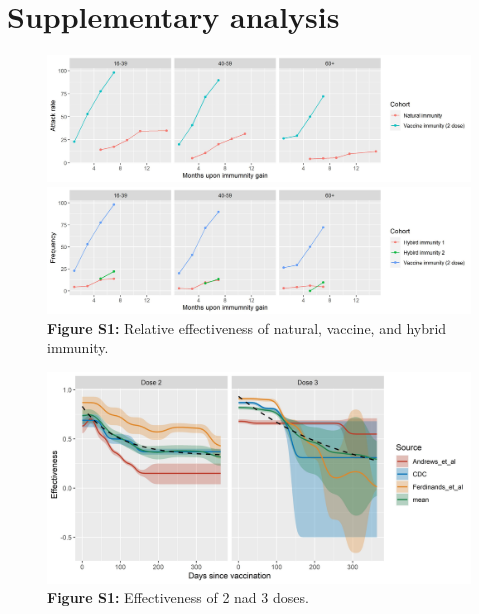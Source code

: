 \documentclass[12pt]{article}
\begin{document}
\section{Supplementary analysis}

\begin{figure}[h]
    \includegraphics*[width=\textwidth]{vaccine_unvaccinated.jpg}
    \includegraphics*[width=\textwidth]{vaccine_vaccined.jpg}
    \textbf{Figure S1:} Relative effectiveness of natural, vaccine, and hybrid immunity.
\end{figure}

\begin{figure}[h]
    \includegraphics*[width=\textwidth]{Three_paper_avg.jpg}
    \textbf{Figure S1:} Effectiveness of 2 nad 3 doses.
\end{figure}

\newpage
    
\end{document}
